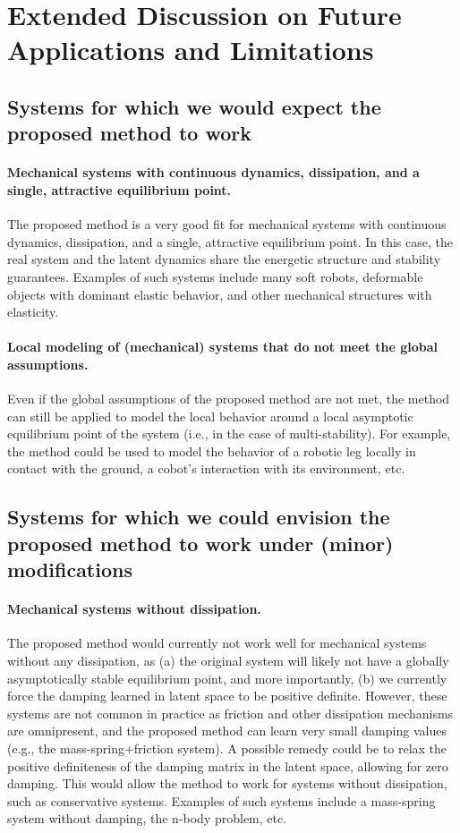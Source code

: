 \section{Extended Discussion on Future Applications and Limitations}\label{apx:sec:limitations}

\subsection{Systems for which we would expect the proposed method to work}
\paragraph{Mechanical systems with continuous dynamics, dissipation, and a single, attractive equilibrium point.}
The proposed method is a very good fit for mechanical systems with continuous dynamics, dissipation, and a single, attractive equilibrium point. In this case, the real system and the latent dynamics share the energetic structure and stability guarantees. Examples of such systems include many soft robots, deformable objects with dominant elastic behavior, and other mechanical structures with elasticity.

\paragraph{Local modeling of (mechanical) systems that do not meet the global assumptions.}
Even if the global assumptions of the proposed method are not met, the method can still be applied to model the local behavior around a local asymptotic equilibrium point of the system (i.e., in the case of multi-stability). For example, the method could be used to model the behavior of a robotic leg locally in contact with the ground, a cobot's interaction with its environment, etc.

\subsection{Systems for which we could envision the proposed method to work under (minor) modifications}
\paragraph{Mechanical systems without dissipation.}
The proposed method would currently not work well for mechanical systems without any dissipation, as (a) the original system will likely not have a globally asymptotically stable equilibrium point, and more importantly, (b) we currently force the damping learned in latent space to be positive definite. However, these systems are not common in practice as friction and other dissipation mechanisms are omnipresent, and the proposed method can learn very small damping values (e.g., the mass-spring+friction system). A possible remedy could be to relax the positive definiteness of the damping matrix in the latent space, allowing for zero damping. This would allow the method to work for systems without dissipation, such as conservative systems. Examples of such systems include a mass-spring system without damping, the n-body problem, etc.

